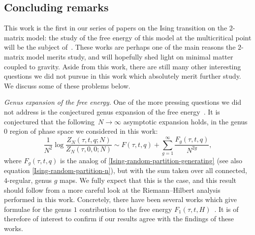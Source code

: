 \documentclass[10pt,a4paper]{amsart}
\numberwithin{equation}{section}
\begin{document}
\subsection{Concluding remarks}
This work is the first in our series of papers on the Ising transition on the $2$-matrix model: the study of the free energy of this
model at the multicritical point will be the subject of~\cite{DHL3, DHL2}. These works are perhaps one of the main reasons the $2$-matrix
model merits study, and will hopefully shed light on minimal matter coupled to gravity. Aside from this work, there are still many other
interesting questions we did not pursue in this work which absolutely merit further study. We discuss some of these problems below.



\textit{Genus expansion of the free energy.} One of the more pressing questions we did not
address is the conjectured genus expansion of the free energy~\cite{PGZ, Eynard}. It is conjectured that the following~${N\to \infty}$ asymptotic expansion holds, in the genus $0$ region of phase space we considered in this work:
 \begin{equation*}
 \frac{1}{N^2} \log \frac{Z_N(\tau,t,q;N)}{Z_N(\tau,0,0;N)} \sim F(\tau,t,q) + \sum_{g=1}^{\infty} \frac{F_g(\tau,t,q)}{N^{2g}},
 \end{equation*}
where $F_g(\tau,t,q)$ is the analog of \eqref{Ising-random-partition-generating} (see also equation \eqref{Ising-random-partition-n}), but with the sum taken over all connected, $4$-regular, genus $g$ maps. We fully expect that this is the case, and this result should follow from a more careful look at the Riemann--Hilbert analysis performed in this work. Concretely, there have been several works which
give formulae for the genus $1$ contribution to the free energy $F_1(\tau,t,H)$~\cite{AAD,Eynard}. It is of therefore of interest to confirm if our results agree with the findings of these works.
\end{document}
